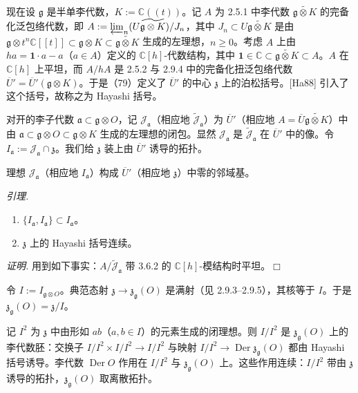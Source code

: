  现在设 $\mathfrak{g}$ 是半单李代数，$K := \mathbb{C}((t))$。记 $A$ 为 2.5.1 中李代数 $\widetilde{\mathfrak{g}\otimes K}$ 的完备化泛包络代数，即 $A := \varprojlim_{n}(U\widetilde{\mathfrak{g}\otimes K})/J_{n}$，其中 $J_{n} \subset U\widetilde{\mathfrak{g}\otimes K}$ 是由 $\mathfrak{g}\otimes t^{n}\mathbb{C}[[t]] \subset \mathfrak{g}\otimes K \subset \widetilde{\mathfrak{g}\otimes K}$ 生成的左理想，$n \ge 0$。考虑 $A$ 上由 $ha = \mathbf{1}\cdot a - a$（$a \in A$）定义的 $\mathbb{C}[h]$-代数结构，其中 $\mathbf{1} \in \mathbb{C} \subset \widetilde{\mathfrak{g}\otimes K} \subset A$。$A$ 在 $\mathbb{C}[h]$ 上平坦，而 $A/hA$ 是 2.5.2 与 2.9.4 中的完备化扭泛包络代数 $\overline{U}' = \overline{U}'(\mathfrak{g}\otimes K)$。于是（79）定义了 $\overline{U}'$ 的中心 $\mathfrak{z}$ 上的泊松括号。[Ha88] 引入了这个括号，故称之为 Hayashi 括号。

 对开的李子代数 $\mathfrak{a} \subset \mathfrak{g}\otimes O$，记 $\mathcal{J}_{\mathfrak{a}}$（相应地 $\widetilde{\mathcal{J}}_{\mathfrak{a}}$）为 $\overline{U}'$（相应地 $A = \overline{U}\widetilde{\mathfrak{g}\otimes K}$）中由 $\mathfrak{a} \subset \mathfrak{g}\otimes O \subset \mathfrak{g}\otimes K$ 生成的左理想的闭包。显然 $\mathcal{J}_{\mathfrak{a}}$ 是 $\widetilde{\mathcal{J}}_{\mathfrak{a}}$ 在 $\overline{U}'$ 中的像。令 $I_{\mathfrak{a}} := \mathcal{J}_{\mathfrak{a}} \cap \mathfrak{z}$。我们给 $\mathfrak{z}$ 装上由 $\overline{U}'$ 诱导的拓扑。


理想 $\mathcal{J}_{\mathfrak{a}}$（相应地 $I_{\mathfrak{a}}$）构成 $\overline{U}'$（相应地 $\mathfrak{z}$）中零的邻域基。

 \emph{引理.}
\begin{enumerate}[label=(\roman*),leftmargin=2.2em]
  \item $\{I_{\mathfrak{a}}, I_{\mathfrak{a}}\} \subset I_{\mathfrak{a}}$。
  \item $\mathfrak{z}$ 上的 Hayashi 括号连续。
\end{enumerate}

\emph{证明.} 用到如下事实：$A/\widetilde{\mathcal{J}}_{\mathfrak{a}}$ 带 3.6.2 的 $\mathbb{C}[h]$-模结构时平坦。\hfill$\Box$

 令 $I := I_{\mathfrak{g}\otimes O}$。典范态射 $\mathfrak{z} \to \mathfrak{z}_{\mathfrak{g}}(O)$ 是满射（见 2.9.3--2.9.5），其核等于 $I$。于是 $\mathfrak{z}_{\mathfrak{g}}(O) = \mathfrak{z}/I$。

记 $I^{2}$ 为 $\mathfrak{z}$ 中由形如 $ab$（$a, b \in I$）的元素生成的闭理想。则 $I/I^{2}$ 是 $\mathfrak{z}_{\mathfrak{g}}(O)$ 上的李代数胚：交换子 $I/I^{2} \times I/I^{2} \to I/I^{2}$ 与映射 $I/I^{2} \to \operatorname{Der}\mathfrak{z}_{\mathfrak{g}}(O)$ 都由 Hayashi 括号诱导。李代数 $\operatorname{Der} O$ 作用在 $I/I^{2}$ 与 $\mathfrak{z}_{\mathfrak{g}}(O)$ 上。这些作用连续：$I/I^{2}$ 带由 $\mathfrak{z}$ 诱导的拓扑，$\mathfrak{z}_{\mathfrak{g}}(O)$ 取离散拓扑。


